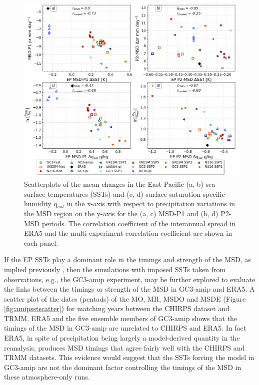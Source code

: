 \begin{figure}[t!]
\includegraphics[width=\linewidth]{figures/sst_scatter_f.png}
\caption[Scatter plot of SST changes]{Scatterplots of the mean changes in the East Pacific (a, b) sea-surface temperatures (SSTs) and (c, d) surface saturation specific humidity q$_{sat}$ in the x-axis with respect to precipitation variations in the MSD region on the y-axis for the (a, c) MSD-P1 and (b, d) P2-MSD periods.  The correlation coefficient of the interannual spread in ERA5 and the multi-experiment correlation coefficient are shown in each panel.   }
\label{fig:var_sst_lhf_scatter}
\end{figure}


If the EP SSTs play a dominant role in the timings and strength of the MSD, as implied previously \citep{magana1999,magana2005,herrera2015}, then the simulations with imposed SSTs taken from observations, e.g., the GC3-amip experiment, may be further explored to evaluate the links  between the timings or strength of the MSD in GC3-amip and ERA5. A scatter plot of the dates (pentads) of the MO, MR, MSDO and MSDE (Figure \ref{fig:amipsstscatter}) for matching years between the CHIRPS dataset and TRMM, ERA5 and the five ensemble members of GC3-amip shows that the timings of the MSD in GC3-amip are unrelated to CHIRPS and ERA5. In fact ERA5, in spite of precipitation being largely a model-derived quantity in the reanalysis, produces MSD timings that agree fairly well with the CHIRPS and TRMM datasets. 
This evidence would suggest that the SSTs forcing the model in GC3-amip are not the dominant factor controlling the timings of the MSD in these atmosphere-only runs.

